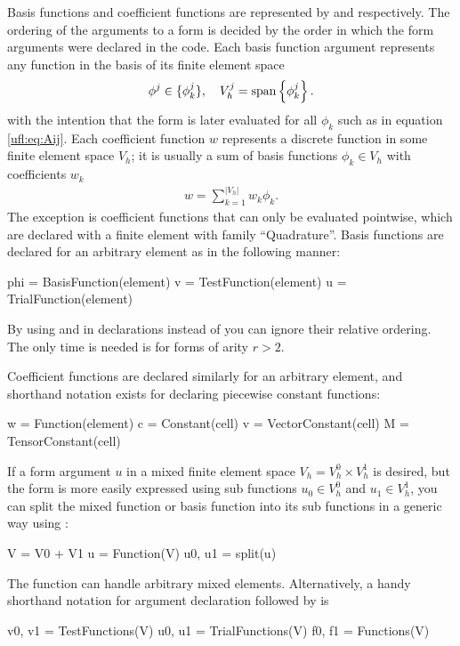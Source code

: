 Basis functions and coefficient functions are represented by
 and  respectively. The ordering
of the arguments to a form is decided by the order in which the form
arguments were declared in the \ufl{} code.  Each basis function
argument represents any function in the basis of its finite element
space
\begin{align}
  \phi^j \in \{\phi_k^j\}, \quad V_h^j = \operatorname{span}\left\{ \phi_k^j \right\}.
\end{align}
with the intention that the form is later evaluated for all $\phi_k$
such as in equation \eqref{ufl:eq:Aij}.  Each coefficient function $w$
represents a discrete function in some finite element space $V_h$; it
is usually a sum of basis functions $\phi_k \in V_h$ with coefficients
$w_k$
\begin{align}
w = \sum_{k=1}^{|V_h|} w_k \phi_k.
\end{align}
The exception is coefficient functions that can only be evaluated
pointwise, which are declared with a finite element with family
``Quadrature''.  Basis functions are declared for an arbitrary element
as in the following manner:
\begin{code}
phi = BasisFunction(element)
v = TestFunction(element)
u = TrialFunction(element)
\end{code}
By using  and  in
declarations instead of  you can ignore their
relative ordering.  The only time  is needed is
for forms of arity $r > 2$.

Coefficient functions are declared similarly for an arbitrary element,
and shorthand notation exists for declaring piecewise constant
functions:
\begin{code}
w = Function(element)
c = Constant(cell)
v = VectorConstant(cell)
M = TensorConstant(cell)
\end{code}
If a form argument $u$ in a mixed finite element space $V_h = V_h^0
\times V_h^1$ is desired, but the form is more easily expressed using
sub functions $u_0 \in V_h^0$ and $u_1 \in V_h^1$, you can split the
mixed function or basis function into its sub functions in a generic
way using :
\begin{code}
V = V0 + V1
u = Function(V)
u0, u1 = split(u)
\end{code}
The  function can handle arbitrary mixed elements.
Alternatively, a handy shorthand notation for argument declaration
followed by  is
\begin{code}
v0, v1 = TestFunctions(V)
u0, u1 = TrialFunctions(V)
f0, f1 = Functions(V)
\end{code}


